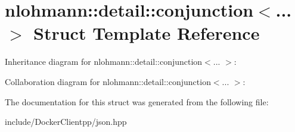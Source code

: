 \hypertarget{structnlohmann_1_1detail_1_1conjunction}{}\section{nlohmann\+::detail\+::conjunction$<$... $>$ Struct Template Reference}
\label{structnlohmann_1_1detail_1_1conjunction}


Inheritance diagram for nlohmann\+::detail\+::conjunction$<$... $>$\+:


Collaboration diagram for nlohmann\+::detail\+::conjunction$<$... $>$\+:


The documentation for this struct was generated from the following file\+:\begin{DoxyCompactItemize}
\item 
include/\+Docker\+Clientpp/json.\+hpp\end{DoxyCompactItemize}
